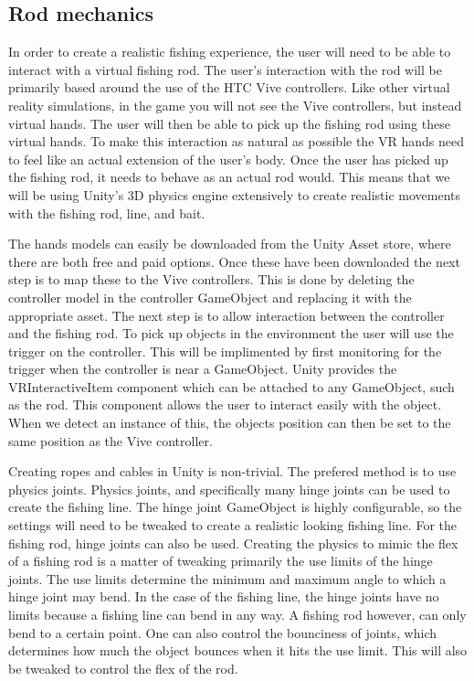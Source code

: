 \documentclass[10pt,journal,compsoc,onecolumn, draftclsnofoot]{IEEEtran}
\begin{document}
\subsection{Rod mechanics}
In order to create a realistic fishing experience, the user will need to be able to interact with a virtual fishing rod.
The user's interaction with the rod will be primarily based around the use of the HTC Vive controllers.
Like other virtual reality simulations, in the game you will not see the Vive controllers, but instead virtual hands.
The user will then be able to pick up the fishing rod using these virtual hands.
To make this interaction as natural as possible the VR hands need to feel like an actual extension of the user's body.
Once the user has picked up the fishing rod, it needs to behave as an actual rod would.
This means that we will be using Unity's 3D physics engine extensively to create realistic movements with the fishing rod, line, and bait.

The hands models can easily be downloaded from the Unity Asset store, where there are both free and paid options.
Once these have been downloaded the next step is to map these to the Vive controllers.
This is done by deleting the controller model in the controller GameObject and replacing it with the appropriate asset.
The next step is to allow interaction between the controller and the fishing rod.
To pick up objects in the environment the user will use the trigger on the controller.
This will be implimented by first monitoring for the trigger when the controller is near a GameObject.
Unity provides the VRInteractiveItem component which can be attached to any GameObject, such as the rod.\cite{unity_controller_interaction}
This component allows the user to interact easily with the object.
When we detect an instance of this, the objects position can then be set to the same position as the Vive controller.

Creating ropes and cables in Unity is non-trivial.
The prefered method is to use physics joints.
Physics joints, and specifically many hinge joints can be used to create the fishing line.
The hinge joint GameObject is highly configurable, so the settings will need to be tweaked to create a realistic looking fishing line.
For the fishing rod, hinge joints can also be used.
Creating the physics to mimic the flex of a fishing rod is a matter of tweaking primarily the use limits of the hinge joints.
The use limits determine the minimum and maximum angle to which a hinge joint may bend.\cite{unity_physics_joints}
In the case of the fishing line, the hinge joints have no limits because a fishing line can bend in any way.
A fishing rod however, can only bend to a certain point.
One can also control the bounciness of joints, which determines how much the object bounces when it hits the use limit.
This will also be tweaked to control the flex of the rod.



\end{document}

